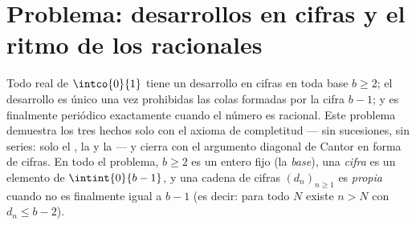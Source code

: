 \section{Problema: desarrollos en cifras y el ritmo de los racionales}

\begin{problem}
\label{pb:b1:reals:1}
Todo real de $\intco{0}{1}$ tiene un desarrollo en cifras en toda base
$b \geq 2$; el desarrollo es único una vez prohibidas las colas
formadas por la cifra $b - 1$; y es finalmente periódico exactamente
cuando el número es racional. Este problema demuestra los tres hechos
solo con el axioma de completitud --- sin sucesiones, sin series: solo
el , la  y la  --- y cierra
con el argumento diagonal de Cantor en forma de cifras. En todo el
problema, $b \geq 2$ es un entero fijo (la \emph{base}), una
\emph{cifra} es un elemento de $\intint{0}{b-1}$, y una cadena de
cifras $(d_n)_{n \geq 1}$ es \emph{propia} cuando no es finalmente
igual a $b - 1$ (es decir: para todo $N$ existe $n > N$ con
$d_n \leq b - 2$).


\end{problem}
